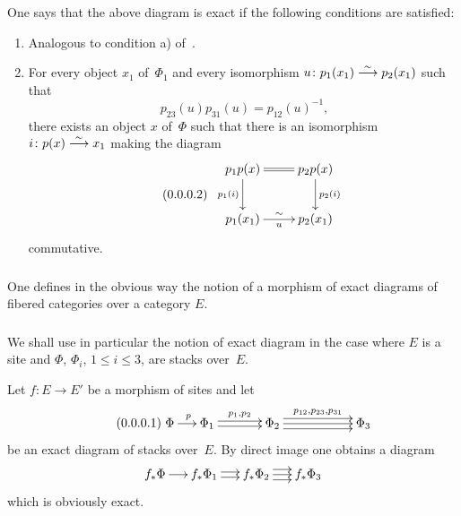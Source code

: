 \begin{definitions}
One says that the above diagram is exact if the following
conditions are satisfied:
\begin{enumerate}
\item[a)] Analogous to condition a) of~.
\item[b)] For every object $x_1$ of~$\Phi_1$ and every isomorphism
$u \colon p_1(x_1) \overset{\sim}{\longrightarrow} p_2(x_1)$ such that
\begin{equation*}
\label{eq:XIII.1.10.2.1}
\tag{\thesubsubsection.1} { p_{23}(u) p_{31}(u) = p_{12}(u)^{-1}
\text{,} }
\end{equation*}
there exists an object $x$ of~$\Phi$ such that there is an isomorphism $i
\colon p(x) \overset{\sim}{\longrightarrow} x_1$ making the diagram
\begin{equation*}
\label{eq:XIII.1.10.2.2}
\tag{\thesubsubsection.2}
\begin{array}{c}
{ \xymatrix{ p_1p(x) \ar@{=}[r]
\ar[d]_{p_1(i)} & p_2p(x) \ar[d]^{p_2(i)} \\ p_1(x_1) \ar[r]^{\sim}_u
& p_2(x_1)
} }
\end{array}
\end{equation*}
commutative.
\end{enumerate}

\subsubsection{}
\label{XIII.1.10.3}
One defines in the obvious way the notion of a morphism of
exact diagrams of fibered categories over a
category $E$.
\end{definitions}

\subsubsection{}
\label{XIII.1.10.4}
We shall use
in particular the notion of exact diagram in the
case where $E$ is a site and $\Phi$, $\Phi_i$, $1 \leqslant i
\leqslant 3$, are stacks over~$E$.

Let $f \colon E \to E'$ be a morphism of sites and let
\begin{equation*}
\label{eq:XIII.1.10.4.1}
\tag{\thesubsubsection.1} { \xymatrix@C=.5cm{ \Phi \ar[r]^p & \Phi_1
\ar@<2pt>[rr]^{p_1,p_2} \ar@<-2pt>[rr] && \Phi_2
\ar@<4pt>[rrr]^{p_{12},p_{23},p_{31}} \ar[rrr] \ar@<-4pt>[rrr] &&&
\Phi_3 } }
\end{equation*}
be an exact diagram of stacks over~$E$. By direct image one obtains a
diagram
$$
\xymatrix@C=.5cm{ f_* \Phi \ar[r] & f_* \Phi_1 \ar@<2pt>[r]
\ar@<-2pt>[r] & f_* \Phi_2 \ar@<4pt>[r]\ar[r] \ar@<-4pt>[r] &
f_* \Phi_3 }
$$
which is obviously exact.

